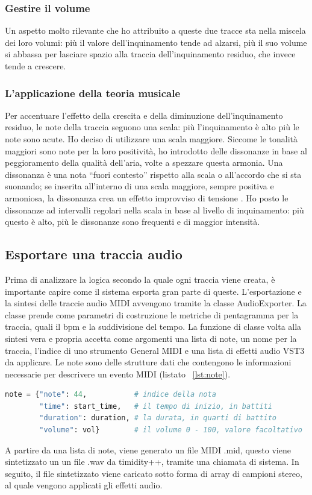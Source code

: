 \subsubsection{Gestire il volume}
Un aspetto molto rilevante che ho attribuito a queste due tracce sta nella miscela dei loro volumi: più il valore dell'inquinamento tende ad alzarsi, più il suo volume si abbassa per lasciare spazio alla traccia dell'inquinamento residuo, che invece tende a crescere.
\subsubsection{L'applicazione della teoria musicale}
Per accentuare l'effetto della crescita e della diminuzione dell'inquinamento residuo, le note della traccia seguono una scala: più l'inquinamento è alto più le note sono acute.
Ho deciso di utilizzare una scala maggiore. Siccome le tonalità maggiori sono note per la loro positività, ho introdotto delle dissonanze in base al peggioramento della qualità dell'aria, volte a spezzare questa armonia.
Una dissonanza è una nota “fuori contesto” rispetto alla scala o all'accordo che si sta suonando; se inserita all'interno di una scala maggiore, sempre positiva e armoniosa, la dissonanza crea un effetto improvviso di tensione \cite{dissonance}.
Ho posto le dissonanze ad intervalli regolari nella scala in base al livello di inquinamento: più questo è alto, più le dissonanze sono frequenti e di maggior intensità.




\subsection{Esportare una traccia audio}
Prima di analizzare la logica secondo la quale ogni traccia viene creata, è importante capire come il sistema esporta gran parte di queste.
L'esportazione e la sintesi delle traccie audio MIDI avvengono tramite la classe AudioExporter.
La classe prende come parametri di costruzione le metriche di pentagramma per la traccia, quali il bpm e la suddivisione del tempo.
La funzione di classe volta alla sintesi vera e propria accetta come argomenti una lista di note, un nome per la traccia, l'indice di uno strumento General MIDI e una lista di effetti audio VST3 da applicare.
Le note sono delle strutture dati che contengono le informazioni necessarie per descrivere un evento MIDI (listato ~\ref{lst:note}).

\begin{lstlisting}[language=Python,caption={Composizione di una nota.},label={lst:note}]
note = {"note": 44,           # indice della nota
        "time": start_time,   # il tempo di inizio, in battiti 
        "duration": duration, # la durata, in quarti di battito
        "volume": vol}        # il volume 0 - 100, valore facoltativo
\end{lstlisting}
A partire da una lista di note, viene generato un file MIDI .mid, questo viene sintetizzato un un file .wav da timidity++, tramite una chiamata di sistema.
In seguito, il file sintetizzato viene caricato sotto forma di array di campioni stereo, al quale vengono applicati gli effetti audio.



